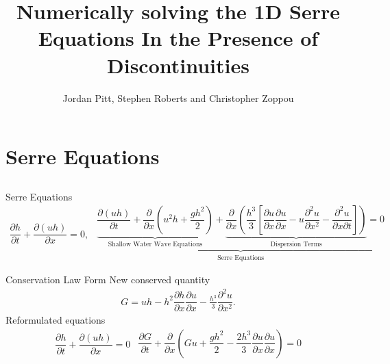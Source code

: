 \documentclass[pdf]{beamer}
\title{Numerically solving the 1D Serre Equations In the Presence of Discontinuities}
\author{Jordan Pitt, Stephen Roberts and Christopher Zoppou}
\begin{document}
\begin{frame}
\titlepage
\end{frame}
\section{Serre Equations}
\subsection{}

\begin{frame}{Serre Equations}
\begin{subequations}\label{eq:Serre_conservative_form}
\begin{gather*}
\dfrac{\partial h}{\partial t} + \dfrac{\partial (uh)}{\partial x} = 0,
\label{eq:Serre_continuity}
\end{gather*}
\begin{gather*}
\underbrace{\underbrace{\dfrac{\partial (uh)}{\partial t} + \dfrac{\partial}{\partial x} \left ( u^2h + \dfrac{gh^2}{2}\right )}_{\text{Shallow Water Wave Equations}} + \underbrace{\dfrac{\partial}{\partial x} \left (  \dfrac{h^3}{3} \left [ \dfrac{\partial u }{\partial x} \dfrac{\partial u}{\partial x} -u \dfrac{\partial^2 u}{\partial x^2}  - \dfrac{\partial^2 u}{\partial x \partial t}\right ] \right )}_{\text{Dispersion Terms}} = 0}_{\text{Serre Equations}}
\label{eq:Serre_momentum}
\end{gather*}
\end{subequations}
\end{frame}

\begin{frame}{Conservation Law Form}
New conserved quantity
\begin{gather}\label{eq:Gdefinition}
G = uh - h^2 \dfrac{\partial h}{\partial x} \dfrac{\partial u}{\partial x} - \frac{h^3}{3} \dfrac{\partial^2 u}{\partial x^2}.
\end{gather}
Reformulated equations
\begin{subequations}
\begin{gather}
\dfrac{\partial h}{\partial t} + \dfrac{\partial (uh)}{\partial x} = 0
\label{eq:Serrecon_continuity}
\end{gather}
\begin{gather}
\dfrac{\partial G}{\partial t} + \dfrac{\partial}{\partial x}\left(Gu + \dfrac{gh^2}{2} - \dfrac{2h^3}{3}\dfrac{\partial u}{\partial x}\dfrac{\partial u}{\partial x}\right) = 0
\label{eq:Serrecon_momentum}
\end{gather}
\label{eq:Serrecon}
\end{subequations}
\end{frame}
\end{document}
